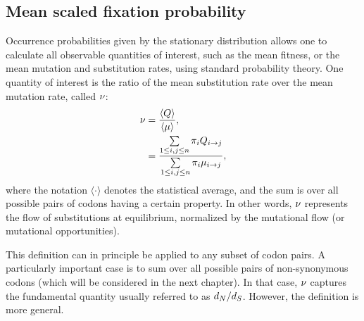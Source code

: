 \subsection{Mean scaled fixation probability}
\label{subsec:mean-scaled-fixation-probability}

Occurrence probabilities given by the stationary distribution allows one to calculate all observable quantities of interest, such as the mean fitness, or the mean mutation and \gls{substitution} rates, using standard probability theory.
One quantity of interest is the ratio of the mean \gls{substitution} rate over the mean mutation rate, called $ \nu $:
\begin{align}
    \nu & = \dfrac{ \langle Q \rangle }{\langle \mu \rangle},
    \label{eq:relative-sub-rate} \\
    & = \dfrac{ \sum\limits_{1 \leq {i}, {j} \leq n} \pi_{{i}} Q_{{i} \to {j}}}{\sum\limits_{1 \leq {i}, {j} \leq n} \pi_{{i}} \mu_{{i} \to {j}}},
\end{align}
where the notation $\langle \cdot \rangle$ denotes the statistical average, and the sum is over all possible pairs of \glspl{codon} having a certain property.
In other words, $\nu$ represents the flow of \glspl{substitution} at equilibrium, normalized by the mutational flow (or mutational opportunities).

This definition can in principle be applied to any subset of \gls{codon} pairs.
A particularly important case is to sum over all possible pairs of \gls{non-synonymous} \glspl{codon} (which will be considered in the next chapter).
In that case, $\nu$ captures the fundamental quantity usually referred to as $d_N / d_S$.
However, the definition is more general.

